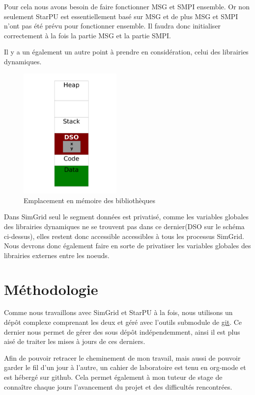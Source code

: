 \documentclass[smallextended]{svjour3}
\begin{document}
Pour cela nous avons besoin de faire fonctionner MSG et SMPI
ensemble. Or non seulement StarPU est essentiellement basé sur MSG
et de plus MSG et SMPI n'ont pas été prévu pour fonctionner
ensemble. Il faudra donc initialiser correctement à la fois la
partie MSG et la partie SMPI. 

Il y a un également un autre point à prendre en considération,
celui des librairies dynamiques. 

\begin{figure}[htb]
\centering
\includegraphics[width=5cm]{./Img/Dyn.pdf}
\caption{\label{fig:2}Emplacement en mémoire des bibliothèques}
\end{figure}

Dans SimGrid seul le segment données est privatisé, comme les
variables globales des librairies dynamiques ne se trouvent pas
dans ce dernier(DSO sur le schéma ci-dessus), elles restent donc
accessible accessibles à tous les processus SimGrid. Nous devrons donc
également faire en sorte de privatiser les variables globales des
librairies externes entre les noeuds. 

\section{Méthodologie}
\label{sec-4}
Comme nous travaillons avec SimGrid et StarPU à la fois, nous
utilisons un dépôt complexe comprenant les deux et géré avec
l'outils submodule de \href{https://github.com/swhatelse/Journal}{git}. Ce dernier nous permet de gérer des sous
dépôt indépendemment, ainsi il est plus aisé de traiter les mises à
jours de ces derniers.

Afin de pouvoir retracer le cheminement de mon travail, mais aussi
de pouvoir garder le fil d'un jour à l'autre, un cahier de
laboratoire est tenu en org-mode et est hébergé sur github. Cela permet
également à mon tuteur de stage de connaître chaque jours l'avancement
du projet et des difficultés rencontrées.
\end{document}
